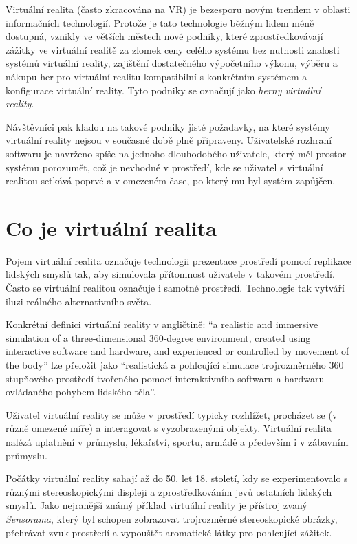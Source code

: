 Virtuální realita (často zkracována na VR) je bezesporu novým trendem v
oblasti informačních technologií. Protože je tato technologie běžným
lidem méně dostupná, vznikly ve větších městech nové podniky, které
zprostředkovávají zážitky ve virtuální realitě za zlomek ceny celého
systému bez nutnosti znalosti systémů virtuální reality, zajištění
dostatečného výpočetního výkonu, výběru a nákupu her pro virtuální
realitu kompatibilní s konkrétním systémem a konfigurace virtuální
reality. Tyto podniky se označují jako \emph{herny virtuální reality}.

Návštěvníci pak kladou na takové podniky jisté požadavky, na které
systémy virtuální reality nejsou v současné době plně připraveny.
Uživatelské rozhraní softwaru je navrženo spíše na jednoho dlouhodobého
uživatele, který měl prostor systému porozumět, což je nevhodné v
prostředí, kde se uživatel s virtuální realitou setkává poprvé a v
omezeném čase, po který mu byl systém zapůjčen.

\section{Co je virtuální
realita}\label{co-je-virtuuxe1lnuxed-realita}

Pojem virtuální realita označuje technologii prezentace prostředí pomocí
replikace lidských smyslů tak, aby simulovala přítomnost uživatele v
takovém prostředí. Často se virtuální realitou označuje i samotné
prostředí. Technologie tak vytváří iluzi reálného alternativního světa.

Konkrétní definici virtuální reality v angličtině: ``a realistic and
immersive simulation of a three-dimensional 360-degree environment,
created using interactive software and hardware, and experienced or
controlled by movement of the body'' lze přeložit jako ``realistická a
pohlcující simulace trojrozměrného 360 stupňového prostředí tvořeného
pomocí interaktivního softwaru a hardwaru ovládaného pohybem lidského
těla''.

Uživatel virtuální reality se může v prostředí typicky rozhlížet,
procházet se (v různě omezené míře) a interagovat s vyzobrazenými
objekty. Virtuální realita nalézá uplatnění v průmyslu, lékařství,
sportu, armádě a především i v zábavním průmyslu.

Počátky virtuální reality sahají až do 50. let 18. století, kdy se
experimentovalo s různými stereoskopickými displeji a zprostředkováním
jevů ostatních lidských smyslů. Jako nejranější známý příklad virtuální
reality je přístroj zvaný \emph{Sensorama}, který byl schopen zobrazovat
trojrozměrné stereoskopické obrázky, přehrávat zvuk prostředí a
vypouštět aromatické látky pro pohlcující zážitek.

